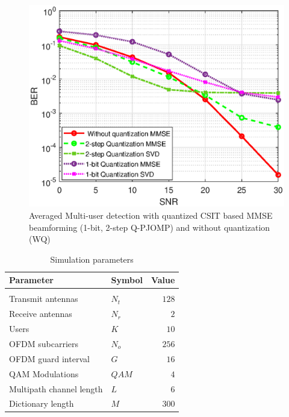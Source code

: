 \begin{center}
\begin{figure}[h!]
    \centering
\includegraphics[scale=0.8]{figures/fig_ch_rec/detection-JOMP.eps}
\caption{Averaged Multi-user detection with quantized CSIT based MMSE beamforming (1-bit, 2-step Q-PJOMP) and without quantization (WQ)\label{Fdetection-jomp} } 
\end{figure}
\begin{table} \footnotesize
    \renewcommand{\arraystretch}{1.1}
    \caption{Simulation parameters}
    \label{tabSim}
    \centering
    \begin{tabular}{llr}
        \textbf{Parameter}&\textbf{Symbol}&\textbf{Value}\\
        \hline
        \\
        Transmit antennas & $N_t$&$128$\\
        Receive antennas & $N_r$&$2$\\
        Users            & $K$&$10$\\
        OFDM subcarriers & $N_o$&$256$\\
        OFDM guard interval & $G$&$16$\\
        QAM Modulations & $QAM$&$4$\\
        Multipath channel length & $L$&$6$ \\
        Dictionary length & $M$ & $300$
    \end{tabular}
\end{table}\end{center}

